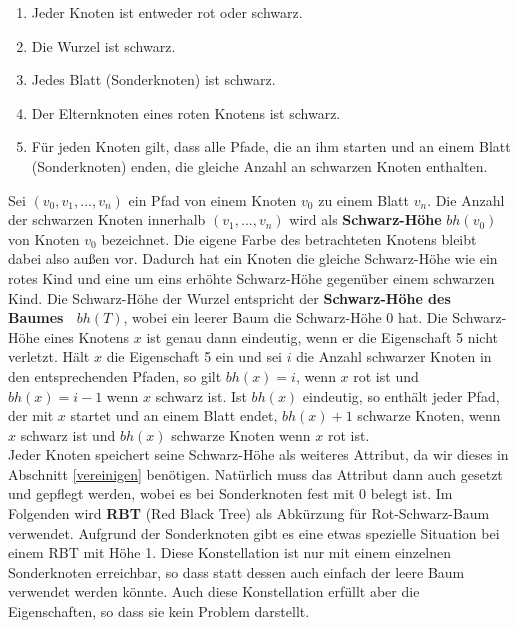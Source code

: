 \documentclass[a4paper,12pt]{article}
\begin{document}
\begin{enumerate}
	\item Jeder Knoten ist entweder rot oder schwarz.
	\item Die Wurzel ist schwarz.
	\item Jedes Blatt (Sonderknoten) ist schwarz.
	\item Der Elternknoten eines roten Knotens ist schwarz.
	\item Für jeden Knoten gilt, dass alle Pfade, die an ihm starten und an einem Blatt (Sonderknoten) enden, die gleiche Anzahl an schwarzen Knoten enthalten. 
\end{enumerate}  
Sei $(v_0,v_1,...,v_n)$ ein Pfad von einem Knoten $v_0$ zu einem Blatt $v_n$. Die Anzahl der schwarzen Knoten innerhalb $(v_1,...,v_n)$ wird als \textbf{Schwarz-Höhe} $\mathit{bh(v_0)}$ von Knoten $v_0$ bezeichnet. Die eigene Farbe des betrachteten Knotens bleibt dabei also außen vor. Dadurch hat ein Knoten die gleiche Schwarz-Höhe wie ein rotes Kind und eine um eins erhöhte Schwarz-Höhe gegenüber einem schwarzen Kind. Die Schwarz-Höhe der Wurzel entspricht der \textbf{Schwarz-Höhe des Baumes~ $bh(T)$}, wobei ein leerer Baum die Schwarz-Höhe $0$ hat. Die Schwarz-Höhe eines Knotens $x$ ist genau dann eindeutig, wenn er die Eigenschaft 5 nicht verletzt. Hält $x$ die Eigenschaft 5 ein und sei $i$ die Anzahl schwarzer Knoten in den entsprechenden Pfaden, so gilt $\mathit{bh(x)} = i$, wenn $x$ rot ist und $\mathit{bh(x)} = i - 1$ wenn $x$ schwarz ist. Ist $\mathit{bh(x)}$ eindeutig, so enthält jeder Pfad, der mit $x$ startet und an einem Blatt endet, $\mathit{bh(x)} + 1$ schwarze Knoten, wenn $x$ schwarz ist und  $\mathit{bh(x)}$ schwarze Knoten wenn $x$ rot ist.\\ Jeder Knoten speichert seine Schwarz-Höhe als weiteres Attribut, da wir dieses in Abschnitt \ref{vereinigen} benötigen. Natürlich muss das Attribut dann auch gesetzt und gepflegt werden, wobei es bei Sonderknoten fest mit $0$ belegt ist. Im Folgenden wird \textbf{RBT} (Red Black Tree) als Abkürzung für Rot-Schwarz-Baum verwendet. Aufgrund der Sonderknoten gibt es eine etwas spezielle Situation bei einem RBT mit Höhe 1. Diese Konstellation ist nur mit einem einzelnen Sonderknoten erreichbar, so dass statt dessen auch einfach der leere Baum verwendet werden könnte. Auch diese Konstellation erfüllt aber die Eigenschaften, so dass sie kein Problem darstellt. \\
\end{document}
